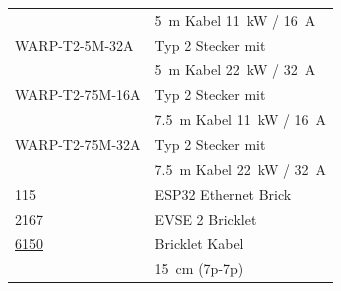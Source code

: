 \documentclass[a4paper,10pt]{article}
\begin{document}
\begin{multicols*}{2}
\begin{tabular}{ll}
		                                                                                                                         & \SI{5}{\meter} Kabel \SI{11}{\kilo\watt} / \SI{16}{\ampere}   \\
		\cmidrule(lr{0.5em}){1-2}
		WARP-T2-5M-32A                                                                                                           & Typ 2 Stecker mit                                             \\
		                                                                                                                         & \SI{5}{\meter} Kabel \SI{22}{\kilo\watt} / \SI{32}{\ampere}   \\
		\cmidrule(lr{0.5em}){1-2}
		WARP-T2-75M-16A                                                                                                          & Typ 2 Stecker mit                                             \\
		                                                                                                                         & \SI{7,5}{\meter} Kabel \SI{11}{\kilo\watt} / \SI{16}{\ampere} \\
		\cmidrule(lr{0.5em}){1-2}
		WARP-T2-75M-32A                                                                                                          & Typ 2 Stecker mit                                             \\
		                                                                                                                         & \SI{7,5}{\meter} Kabel \SI{22}{\kilo\watt} / \SI{32}{\ampere} \\
		\cmidrule(lr{0.5em}){1-2}
		115																														 & ESP32 Ethernet Brick                                                   \\
		\cmidrule(lr{0.5em}){1-2}
		2167																													 & EVSE 2 Bricklet                                                 \\
		\cmidrule(lr{0.5em}){1-2}
		\href{https://www.tinkerforge.com/de/shop/accessories/cable/bricklet-cable-15cm-7p-7p.html}{6150}                        & Bricklet Kabel                                                \\
		                                                                                                                         & \SI{15}{\centi\meter} (7p-7p)                                 \\
	\end{tabular}


\end{multicols*}
\end{document}
